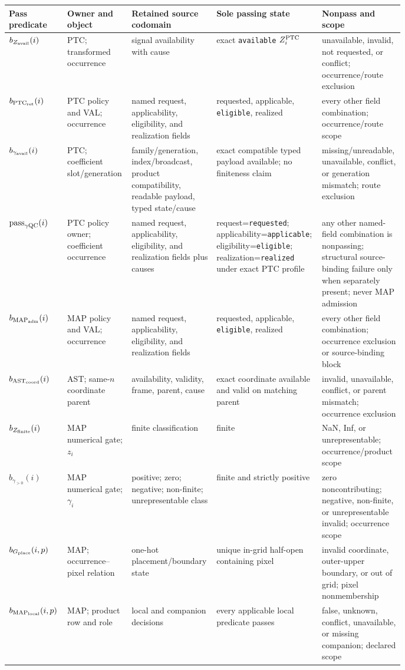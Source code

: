 \documentclass[10pt]{article}
\newcommand{\code}[1]{\nolinkurl{#1}}
\begin{document}
{\footnotesize
\begin{longtable}{L{0.11\linewidth}L{0.15\linewidth}L{0.17\linewidth}L{0.19\linewidth}L{0.16\linewidth}}
\toprule
Pass predicate & Owner and object & Retained source codomain & Sole passing state & Nonpass and scope\\
\midrule
\(b_{Z_{\rm avail}}(i)\) & PTC; transformed occurrence & signal availability with cause & exact \code{available} \(Z_i^{\rm PTC}\) & unavailable, invalid, not requested, or conflict; occurrence/route exclusion\\
\(b_{{\rm PTC}_{\rm ret}}(i)\) & PTC policy and VAL; occurrence & named request, applicability, eligibility, and realization fields & requested, applicable, \code{eligible}, realized & every other field combination; occurrence/route scope\\
\(b_{\gamma_{\rm avail}}(i)\) & PTC; coefficient slot/generation & family/generation, index/broadcast, product compatibility, readable payload, typed state/cause & exact compatible typed payload available; no finiteness claim & missing/unreadable, unavailable, conflict, or generation mismatch; route exclusion\\
\(\mathrm{pass}_{\gamma{\rm QC}}(i)\) & PTC policy owner; coefficient occurrence & named request, applicability, eligibility, and realization fields plus causes & request=\code{requested}; applicability=\code{applicable}; eligibility=\code{eligible}; realization=\code{realized} under exact PTC profile & any other named-field combination is nonpassing; structural source-binding failure only when separately present; never MAP admission\\
\(b_{{\rm MAP}_{\rm adm}}(i)\) & MAP policy and VAL; occurrence & named request, applicability, eligibility, and realization fields & requested, applicable, \code{eligible}, realized & every other field combination; occurrence exclusion or source-binding block\\
\(b_{{\rm AST}_{\rm coord}}(i)\) & AST; same-\(n\) coordinate parent & availability, validity, frame, parent, cause & exact coordinate available and valid on matching parent & invalid, unavailable, conflict, or parent mismatch; occurrence exclusion\\
\(b_{Z_{\rm finite}}(i)\) & MAP numerical gate; \(z_i\) & finite classification & finite & NaN, Inf, or unrepresentable; occurrence/product scope\\
\(b_{\gamma_{>0}}(i)\) & MAP numerical gate; \(\gamma_i\) & positive; zero; negative; non-finite; unrepresentable class & finite and strictly positive & zero noncontributing; negative, non-finite, or unrepresentable invalid; occurrence scope\\
\(b_{G_{\rm place}}(i,p)\) & MAP; occurrence--pixel relation & one-hot placement/boundary state & unique in-grid half-open containing pixel & invalid coordinate, outer-upper boundary, or out of grid; pixel nonmembership\\
\(b_{{\rm MAP}_{\rm local}}(i,p)\) & MAP; product row and role & local and companion decisions & every applicable local predicate passes & false, unknown, conflict, unavailable, or missing companion; declared scope\\
\bottomrule
\end{longtable}
}
\end{document}
